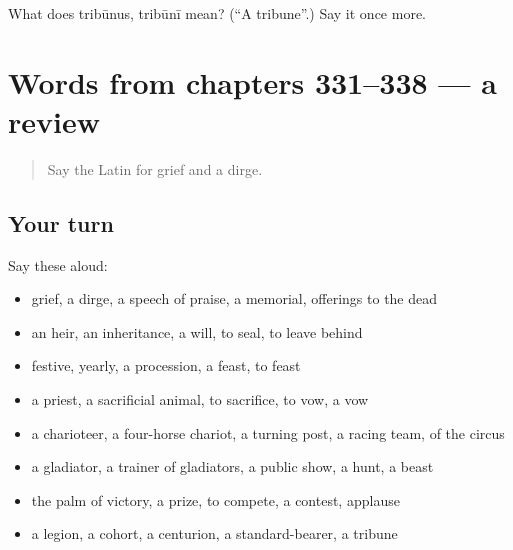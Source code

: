 \begin{tcolorbox}[breakable,colback=teal!4,colframe=teal!35!black,title={Before you move on}]
What does tribūnus, tribūnī mean? (\textquotedblleft{}A tribune\textquotedblright{}.) Say it once more.
\end{tcolorbox}
\section[(dialogue)]{Words from chapters 331–338 — a review}

\label{lesson:LA-R338-review-331-338}



\begin{quote}
Say the Latin for grief and a dirge.
\end{quote}

\subsection*{Your turn}
Say these aloud:

\begin{itemize}
\raggedright
  \item grief, a dirge, a speech of praise, a memorial, offerings to the dead
  \item an heir, an inheritance, a will, to seal, to leave behind
  \item festive, yearly, a procession, a feast, to feast
  \item a priest, a sacrificial animal, to sacrifice, to vow, a vow
  \item a charioteer, a four-horse chariot, a turning post, a racing team, of the circus
  \item a gladiator, a trainer of gladiators, a public show, a hunt, a beast
  \item the palm of victory, a prize, to compete, a contest, applause
  \item a legion, a cohort, a centurion, a standard-bearer, a tribune
\end{itemize}

